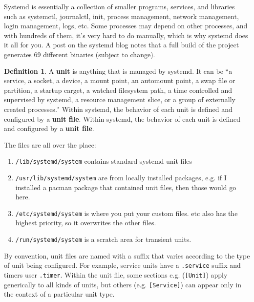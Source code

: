 \documentclass{article}
\theoremstyle{definition}
\newtheorem{definition}{Definition}[section]
\begin{document}
  Systemd is essentially a collection of smaller programs, services, and libraries such as systemctl, journalctl, init, process management, network management, login management, logs, etc. Some processes may depend on other processes, and with hundreds of them, it's very hard to do manually, which is why systemd does it all for you. A post on the systemd blog notes that a full build of the project generates 69 different binaries (subject to change). 

  \begin{definition}
    A \textbf{unit} is anything that is managed by systemd. It can be ``a service, a socket, a device, a mount point, an automount point, a swap file or partition, a startup carget, a watched filesystem path, a time controlled and supervised by systemd, a resource management slice, or a group of externally created processes." Within systemd, the behavior of each unit is defined and configured by a \textbf{unit file}. Within systemd, the behavior of each unit is defined and configured by a \textbf{unit file}. 

    The files are all over the place: 
      \begin{enumerate}
        \item \texttt{/lib/systemd/system} contains standard systemd unit files 
        \item \texttt{/usr/lib/systemd/system} are from locally installed packages, e.g. if I installed a pacman package that contained unit files, then those would go here. 
        \item \texttt{/etc/systemd/system} is where you put your custom files. etc also has the highest priority, so it overwrites the other files.  
        \item \texttt{/run/systemd/system} is a scratch area for transient units. 
      \end{enumerate}

    By convention, unit files are named with a suffix that varies according to the type of unit being configured. For example, service units have a \texttt{.service} suffix and timers user \texttt{.timer}. Within the unit file, some sections e.g. (\texttt{[Unit]}) apply generically to all kinds of units, but others (e.g. \texttt{[Service]}) can appear only in the context of a particular unit type. 

  \end{definition}
\end{document}
